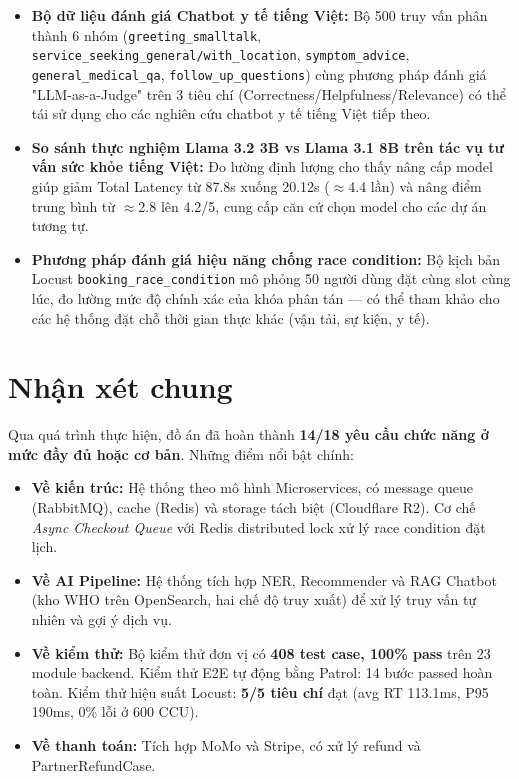 \begin{itemize}
    \item \textbf{Bộ dữ liệu đánh giá Chatbot y tế tiếng Việt:} Bộ 500 truy vấn phân thành 6 nhóm (\texttt{greeting\_smalltalk}, \texttt{service\_seeking\_general/with\_location}, \texttt{symptom\_advice}, \texttt{general\_medical\_qa}, \texttt{follow\_up\_questions}) cùng phương pháp đánh giá "LLM-as-a-Judge" trên 3 tiêu chí (Correctness/Helpfulness/Relevance) có thể tái sử dụng cho các nghiên cứu chatbot y tế tiếng Việt tiếp theo.
    \item \textbf{So sánh thực nghiệm Llama 3.2 3B vs Llama 3.1 8B trên tác vụ tư vấn sức khỏe tiếng Việt:} Đo lường định lượng cho thấy nâng cấp model giúp giảm Total Latency từ 87.8s xuống 20.12s ($\approx$4.4 lần) và nâng điểm trung bình từ $\approx$2.8 lên 4.2/5, cung cấp căn cứ chọn model cho các dự án tương tự.
    \item \textbf{Phương pháp đánh giá hiệu năng chống race condition:} Bộ kịch bản Locust \texttt{booking\_race\_condition} mô phỏng 50 người dùng đặt cùng slot cùng lúc, đo lường mức độ chính xác của khóa phân tán --- có thể tham khảo cho các hệ thống đặt chỗ thời gian thực khác (vận tải, sự kiện, y tế).
\end{itemize}

\section{Nhận xét chung}

Qua quá trình thực hiện, đồ án đã hoàn thành \textbf{14/18 yêu cầu chức năng ở mức đầy đủ hoặc cơ bản}. Những điểm nổi bật chính:

\begin{itemize}
    \item \textbf{Về kiến trúc:} Hệ thống theo mô hình Microservices, có message queue (RabbitMQ), cache (Redis) và storage tách biệt (Cloudflare R2). Cơ chế \textit{Async Checkout Queue} với Redis distributed lock xử lý race condition đặt lịch.

    \item \textbf{Về AI Pipeline:} Hệ thống tích hợp NER, Recommender và RAG Chatbot (kho WHO trên OpenSearch, hai chế độ truy xuất) để xử lý truy vấn tự nhiên và gợi ý dịch vụ.

    \item \textbf{Về kiểm thử:} Bộ kiểm thử đơn vị có \textbf{408 test case, 100\% pass} trên 23 module backend. Kiểm thử E2E tự động bằng Patrol: 14 bước passed hoàn toàn. Kiểm thử hiệu suất Locust: \textbf{5/5 tiêu chí} đạt (avg RT 113.1ms, P95 190ms, 0\% lỗi ở 600 CCU).

    \item \textbf{Về thanh toán:} Tích hợp MoMo và Stripe, có xử lý refund và PartnerRefundCase.
\end{itemize}


